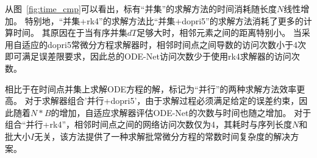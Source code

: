 从图~\ref{fig:time_cmp}可以看出，标有“并集”的求解方法的时间消耗随长度$N$线性增加。
特别地，“并集+rk4”的求解方法比“并集+dopri5”的求解方法消耗了更多的计算时间。
其原因在于当有序并集$dT$足够大时，相邻元素之间的距离特别小。
当采用自适应的dopri5常微分方程求解器时，相邻时间点之间导数的访问次数小于4次即可满足误差限要求，因此总的ODE-Net访问次数少于使用rk4求解器的访问次数。

相比于在时间点并集上求解ODE方程的解，标记为“并行”的两种求解方法效率更高。
对于求解器组合'并行+dopri5'，由于求解过程必须满足给定的误差约束，因此随着$N*B$的增加，自适应求解器评估ODE-Net的次数与时间也随之增加。
对于组合“并行+rk4”，相邻时间点之间的网络访问次数仅为4，其耗时与序列长度$N$和批大小$I$无关，该方法提供了一种求解批常微分方程的常数时间复杂度的解决方案。

